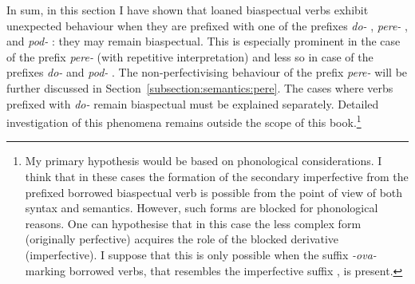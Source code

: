 In sum, in this section I have shown that loaned   biaspectual verbs   exhibit unexpected behaviour when they are prefixed with one of the prefixes \textit{do-}  , \textit{pere-}  , and \textit{pod-}    : they may remain biaspectual. This is especially prominent in the case of the prefix \textit{pere-}   (with repetitive  interpretation) and less so in case of the prefixes \textit{do-}   and \textit{pod-}    . The non-perfectivising   behaviour of the prefix \textit{pere-}   will be further discussed in Section~\ref{subsection:semantics:pere}. The cases where verbs prefixed with \textit{do-}   remain biaspectual must be explained separately. Detailed investigation of this phenomena remains outside the scope of this book.\footnote{My primary hypothesis would be based on phonological considerations. I think that in these cases the formation of the secondary imperfective  from the prefixed borrowed biaspectual verb    is possible from the point of view of both syntax and semantics. However, such forms are blocked for phonological reasons. One can hypothesise that in this case the less complex form (originally perfective) acquires the role of the blocked derivative (imperfective). I suppose that this is only possible when the suffix \textit{-ova-}   marking borrowed verbs, that resembles the imperfective suffix  , is present.}
	

